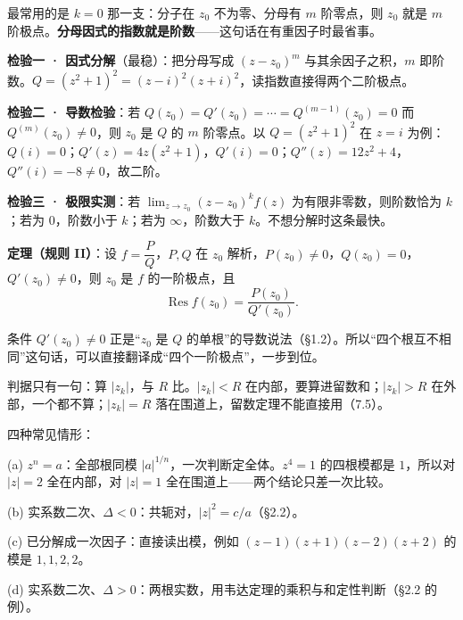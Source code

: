 \documentclass[11pt]{ctexart}
\let\origsubhdr\subhdr
\renewcommand{\subhdr}[1]{\par\needspace{4\baselineskip}\origsubhdr{#1}}
\begin{document}
最常用的是 $k=0$ 那一支：分子在 $z_0$ 不为零、分母有 $m$ 阶零点，则 $z_0$ 就是 $m$ 阶极点。\textbf{分母因式的指数就是阶数}——这句话在有重因子时最省事。


\textbf{检验一 · 因式分解}（最稳）：把分母写成 $(z-z_0)^{m}$ 与其余因子之积，$m$ 即阶数。$Q=(z^{2}+1)^{2}=(z-i)^{2}(z+i)^{2}$，读指数直接得两个二阶极点。

\textbf{检验二 · 导数检验}：若 $Q(z_0)=Q'(z_0)=\cdots=Q^{(m-1)}(z_0)=0$ 而 $Q^{(m)}(z_0)\ne0$，则 $z_0$ 是 $Q$ 的 $m$ 阶零点。以 $Q=(z^{2}+1)^{2}$ 在 $z=i$ 为例：$Q(i)=0$；$Q'(z)=4z(z^{2}+1)$，$Q'(i)=0$；$Q''(z)=12z^{2}+4$，$Q''(i)=-8\ne0$，故二阶。

\textbf{检验三 · 极限实测}：若 $\displaystyle\lim_{z\to z_0}(z-z_0)^{k}f(z)$ 为有限非零数，则阶数恰为 $k$；若为 $0$，阶数小于 $k$；若为 $\infty$，阶数大于 $k$。不想分解时这条最快。


\textbf{定理（规则 II）}：设 $f=\dfrac{P}{Q}$，$P,Q$ 在 $z_0$ 解析，$P(z_0)\ne0$，$Q(z_0)=0$，$Q'(z_0)\ne0$，则 $z_0$ 是 $f$ 的一阶极点，且
\begin{equation}
\operatorname{Res}f(z_0)=\frac{P(z_0)}{Q'(z_0)} .
\label{eq:rule2}
\end{equation}

条件 $Q'(z_0)\ne0$ 正是“$z_0$ 是 $Q$ 的单根”的导数说法（§1.2）。所以“四个根互不相同”这句话，可以直接翻译成“四个一阶极点”，一步到位。



判据只有一句：算 $|z_k|$，与 $R$ 比。$|z_k|<R$ 在内部，要算进留数和；$|z_k|>R$ 在外部，一个都不算；$|z_k|=R$ 落在围道上，留数定理不能直接用（7.5）。

四种常见情形：

(a) $z^{n}=a$：全部根同模 $|a|^{1/n}$，一次判断定全体。$z^{4}=1$ 的四根模都是 $1$，所以对 $|z|=2$ 全在内部，对 $|z|=1$ 全在围道上——两个结论只差一次比较。

(b) 实系数二次、$\Delta<0$：共轭对，$|z|^{2}=c/a$（§2.2）。

(c) 已分解成一次因子：直接读出模，例如 $(z-1)(z+1)(z-2)(z+2)$ 的模是 $1,1,2,2$。

(d) 实系数二次、$\Delta>0$：两根实数，用韦达定理的乘积与和定性判断（§2.2 的例）。
\end{document}
